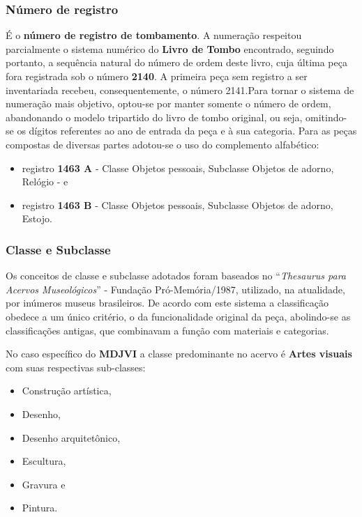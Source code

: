 \subsubsection{Número de registro}
É o \textbf{número de registro de tombamento}. A numeração respeitou parcialmente o sistema numérico do \textbf{Livro de Tombo} encontrado, seguindo portanto, a sequência natural do número de ordem deste livro, cuja última peça fora registrada sob o número \textbf{2140}. A primeira peça sem registro a ser inventariada recebeu, consequentemente, o número 2141.Para tornar o sistema de numeração mais objetivo, optou-se por manter somente o número de ordem, abandonando o modelo tripartido do livro de tombo original, ou seja, omitindo- se os dígitos referentes ao ano de entrada da peça e à sua categoria. Para as peças compostas de diversas partes adotou-se o uso do complemento alfabético: 
\begin{itemize}
	\item registro \textbf{1463 A} - Classe Objetos pessoais, Subclasse Objetos de adorno, Relógio - e 
	\item registro \textbf{1463 B} - Classe Objetos pessoais, Subclasse Objetos de
	adorno, Estojo.
\end{itemize}

\subsubsection{Classe e Subclasse}
Os conceitos de classe e subclasse adotados foram baseados no ``\textit{Thesaurus para Acervos Museológicos}'' - Fundação Pró-Memória/1987, utilizado, na atualidade, por inúmeros museus brasileiros. De acordo com este sistema a classificação obedece a um único critério, o da funcionalidade original da peça, abolindo-se as classificações antigas, que combinavam a função com materiais e categorias. 

No caso específico do \textbf{MDJVI} a classe predominante no acervo é \textbf{Artes visuais} com suas respectivas sub-classes: 
\begin{itemize}
	\item Construção artística, 
	\item Desenho, 
	\item Desenho arquitetônico, 
	\item Escultura, 
	\item Gravura e 
	\item Pintura.
\end{itemize} 

